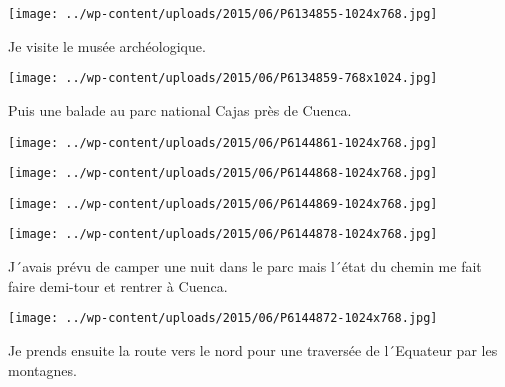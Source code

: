 \begin{center} \texttt{[image: ../wp-content/uploads/2015/06/P6134855-1024x768.jpg]} \end{center}

 

 Je visite le musée archéologique. 

 

\begin{center} \texttt{[image: ../wp-content/uploads/2015/06/P6134859-768x1024.jpg]} \end{center}

 

 Puis une balade au parc national Cajas près de Cuenca. 

 

\begin{center} \texttt{[image: ../wp-content/uploads/2015/06/P6144861-1024x768.jpg]} \end{center}

 

 

\begin{center} \texttt{[image: ../wp-content/uploads/2015/06/P6144868-1024x768.jpg]} \end{center}

 

 

\begin{center} \texttt{[image: ../wp-content/uploads/2015/06/P6144869-1024x768.jpg]} \end{center}

 

 

\begin{center} \texttt{[image: ../wp-content/uploads/2015/06/P6144878-1024x768.jpg]} \end{center}

 

 J´avais prévu de camper une nuit dans le parc mais l´état du chemin me fait faire demi-tour et rentrer à Cuenca. 

 

\begin{center} \texttt{[image: ../wp-content/uploads/2015/06/P6144872-1024x768.jpg]} \end{center}

 

 Je prends ensuite la route vers le nord pour une traversée de l´Equateur par les montagnes. 

